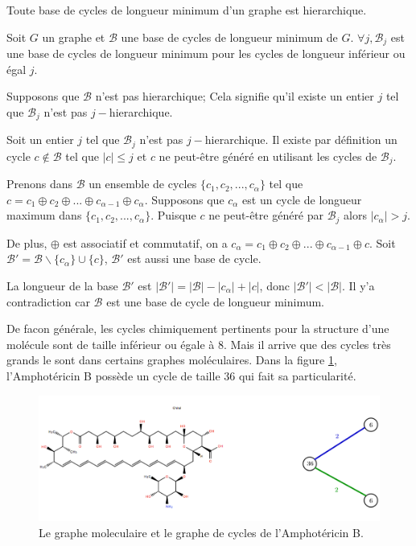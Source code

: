 \begin{lemme}
Toute base de cycles de longueur minimum d'un graphe est hierarchique.
\end{lemme}

\begin{preuve}
Soit $G$ un graphe et $\mathcal{B}$ une base de cycles de longueur minimum de $G$. $\forall j, \mathcal{B}_j$ est une base de cycles de longueur minimum pour les cycles de longueur inférieur ou égal $j$.

Supposons que $\mathcal{B}$ n'est pas hierarchique; Cela signifie qu'il existe un entier $j$ tel que $\mathcal{B}_j$ n'est pas $j-$hierarchique.

Soit un entier $j$ tel que $\mathcal{B}_j$ n'est pas $j-$hierarchique. Il existe par définition un cycle $c \notin \mathcal{B}$ tel que $|c| \leq j$ et $c$ ne peut-être généré en utilisant les cycles de $\mathcal{B}_j$. 

Prenons dans $\mathcal{B}$ un ensemble de cycles $\{c_1, c_2, ..., c_{\alpha}\}$ tel que $ c = c_1 \oplus c_2 \oplus ... \oplus c_{\alpha -1 } \oplus c_{\alpha}$. Supposons que $c_{\alpha}$ est un cycle de longueur maximum dans $\{c_1, c_2, ..., c_{\alpha}\}$. Puisque $c$ ne peut-être généré par $\mathcal{B}_j$ alors $|c_{\alpha}| > j$.

De plus, $\oplus$ est associatif et commutatif, on a $c_{\alpha} = c_1 \oplus c_2 \oplus ... \oplus c_{\alpha -1 }\oplus c$. Soit $\mathcal{B}' = \mathcal{B} \backslash \{c_{\alpha}\}\cup \{c\} $, $\mathcal{B}'$ est aussi une base de cycle.

La longueur de la base $\mathcal{B}'$ est $|\mathcal{B}'| = |\mathcal{B}| -|c_{\alpha}|+ | c| $, donc $|\mathcal{B}'| < |\mathcal{B}| $. Il y'a contradiction car $\mathcal{B}$ est une base de cycle de longueur minimum.
\end{preuve}


De facon générale, les cycles chimiquement pertinents pour la structure d'une molécule sont de taille inférieur ou égale à $8$.  Mais il arrive que des cycles très grands le sont dans certains graphes moléculaires. Dans la figure \ref{ampho}, l'Amphotéricin B possède un cycle de taille $36$ qui fait sa particularité.


\begin{figure}[H]
\label{ampho}
\begin{center}
\includegraphics[scale=0.75]{amphotericin3.png}
\end{center}
\caption{Le graphe moleculaire et le graphe de cycles de l'Amphotéricin B.}
\end{figure}

